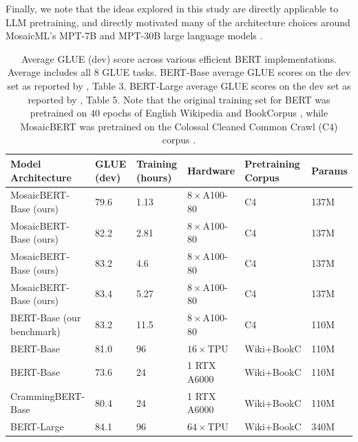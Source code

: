 \documentclass{article}
\begin{document}
Finally, we note that the ideas explored in this study are directly applicable to LLM pretraining, and directly motivated many of the architecture choices around MosaicML's MPT-7B and MPT-30B large language models  \citep{MosaicML2023IntroducingMPT7B,MosaicML2023IntroducingMPT30B}.



\begin{table}[h]
\begin{tabular}{p{4.0cm} p{1.6cm} p{1.0cm} p{2.0cm} p{1.9cm} p{}}
\toprule

\textbf{Model Architecture} & \textbf{GLUE (dev)} & \textbf{Training (hours)} & \textbf{Hardware} & \textbf{Pretraining Corpus} & \textbf{Params} \\
\midrule

MosaicBERT-Base (ours)  & 79.6 & 1.13  & $8\times$A100-80 & C4 & 137M \\ 

MosaicBERT-Base (ours)  & 82.2 & 2.81  & $8\times$A100-80 & C4 & 137M \\ 

MosaicBERT-Base (ours) & 83.2 & 4.6  & $8\times$A100-80 & C4 & 137M \\ 

MosaicBERT-Base (ours) & 83.4 & 5.27  & $8\times$A100-80 & C4 & 137M \\ 

\midrule

BERT-Base (our benchmark)  & 83.2 & 11.5  & $8\times$A100-80 & C4 & 110M \\ 

\midrule

BERT-Base \citep{devlin2018bert,geiping2023cramming} & 81.0 & 96 & $16\times$TPU & Wiki+BookC & 110M \\ 
BERT-Base \citep{geiping2023cramming} & 73.6 & 24  & 1 RTX A6000 & Wiki+BookC & 110M \\
CrammingBERT-Base \citep{geiping2023cramming} & 80.4 & 24  & 1 RTX A6000 & Wiki+BookC & 110M \\
BERT-Large \citep{devlin2018bert,liu2019roberta} & 84.1 & 96 & $64\times$TPU & Wiki+BookC  & 340M \\ 
\bottomrule
\end{tabular}
\caption{Average GLUE (dev) score across various efficient BERT implementations. Average includes all 8 GLUE tasks. BERT-Base average GLUE scores on the dev set as reported by \cite{geiping2023cramming}, Table 3. BERT-Large average GLUE scores on the dev set as reported by \citep{liu2019roberta}, Table 5. Note that the original training set for BERT was pretrained on 40 epochs of English Wikipedia and BookCorpus \citep{zhu2015aligning}, while MosaicBERT was pretrained on the Colossal Cleaned Common Crawl (C4) corpus \citep{raffel2020exploring}.} %
\label{tab:bert_comparison}
\end{table}
\end{document}

